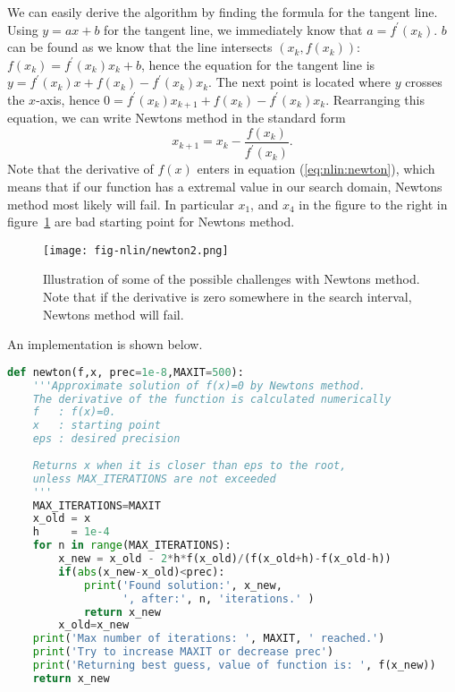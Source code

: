 \documentclass[graybox,sectrefs,envcountresetchap,open=right,final]{svmonodo}
\begin{document}
We can easily derive the algorithm by finding the formula for the tangent line. Using $y=ax+b$ for the tangent line, we immediately know that $a=f^\prime(x_k)$. $b$ can be found as we know that the line intersects $(x_k,f(x_k))$: $f(x_k)=f^\prime(x_k)x_k+b$, hence the equation for the tangent line is $y=f^\prime(x_k)x+f(x_k)-f^\prime(x_k)x_k$. The next point is located where $y$ crosses the $x$-axis, hence $0=f^\prime(x_k)x_{k+1}+f(x_k)-f^\prime(x_k)x_k$. Rearranging this equation, we can write Newtons method in the standard form
\begin{equation}
x_{k+1}=x_k-\frac{f(x_k)}{f^\prime(x_k)}.
\label{eq:nlin:newton}
\end{equation}
Note that the derivative of $f(x)$ enters in equation (\ref{eq:nlin:newton}), which means that if our function has a extremal value in our search domain, Newtons method most likely will fail. In particular $x_1$, and $x_4$ in the figure to the right in figure~\ref{fig:nlin:newton2} are bad starting point for Newtons method.

\begin{figure}[!ht]  %
  \centerline{\texttt{[image: fig-nlin/newton2.png]}}
  \caption{
  Illustration of some of the possible challenges with Newtons method. Note that if the derivative is zero somewhere in the search interval, Newtons method will fail. \label{fig:nlin:newton2}
  }
\end{figure}

An implementation is shown below.

























\begin{lstlisting}[language=python,style=blue1]
def newton(f,x, prec=1e-8,MAXIT=500):
    '''Approximate solution of f(x)=0 by Newtons method.
    The derivative of the function is calculated numerically
    f   : f(x)=0.
    x   : starting point  
    eps : desired precision
    
    Returns x when it is closer than eps to the root, 
    unless MAX_ITERATIONS are not exceeded
    '''
    MAX_ITERATIONS=MAXIT
    x_old = x
    h     = 1e-4
    for n in range(MAX_ITERATIONS):
        x_new = x_old - 2*h*f(x_old)/(f(x_old+h)-f(x_old-h))
        if(abs(x_new-x_old)<prec):
            print('Found solution:', x_new, 
                  ', after:', n, 'iterations.' )
            return x_new
        x_old=x_new
    print('Max number of iterations: ', MAXIT, ' reached.') 
    print('Try to increase MAXIT or decrease prec')
    print('Returning best guess, value of function is: ', f(x_new))
    return x_new

\end{lstlisting}
\end{document}
